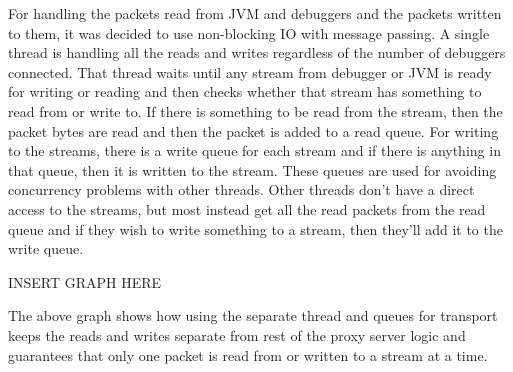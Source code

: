 \documentclass[..thesis.tex]{subfiles}
\begin{document}
For handling the packets read from JVM and debuggers and the packets written to them, it was decided to use non-blocking IO with message passing.
A single thread is handling all the reads and writes regardless of the number of debuggers connected.
That thread waits until any stream from debugger or JVM is ready for writing or reading and then checks whether that stream has something to read from or write to.
If there is something to be read from the stream, then the packet bytes are read and then the packet is added to a read queue.
For writing to the streams, there is a write queue for each stream and if there is anything in that queue, then it is written to the stream.
These queues are used for avoiding concurrency problems with other threads.
Other threads don't have a direct access to the streams, but most instead get all the read packets from the read queue and if they wish to write something to a stream, then they'll add it to the write queue.

INSERT GRAPH HERE

The above graph shows how using the separate thread and queues for transport keeps the reads and writes separate from rest of the proxy server logic and guarantees that only one packet is read from or written to a stream at a time.
\end{document}
